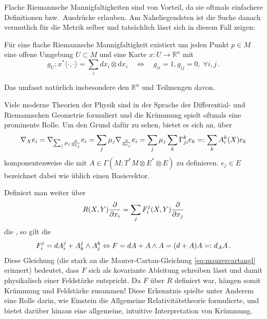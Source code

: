 Flache Riemannsche Mannigfaltigkeiten sind von Vorteil, da sie oftmals einfachere Definitionen bzw.~Ausdrücke erlauben. Am Naheliegendsten ist die Suche danach vermutlich für die Metrik selber und tatsächlich lässt sich in diesem Fall zeigen:

\begin{cor}
Für eine flache Riemannsche Mannigfaltigkeit existiert um jeden Punkt $p \in M$ eine offene Umgebung $U \subset M$ und eine Karte $x: U \rightarrow \mathbb{R}^n$ mit
\begin{equation}
g_U: x^* \langle \cdot, \cdot \rangle = \sum_i dx_i \otimes dx_i \quad \Leftrightarrow \quad g_{ii} = 1, g_{ij} = 0, \; \forall i, j \, .
\end{equation}
\end{cor}
Das umfasst natürlich insbesondere den $\mathbb{R}^n$ und Teilmengen davon.


\begin{bsp}
Viele moderne Theorien der Physik sind in der Sprache der Differential- und Riemannschen Geometrie formuliert und die Krümmung spielt oftmals eine prominente Rolle. Um den Grund dafür zu sehen, bietet es sich an, über
\begin{equation}
\nabla_X e_i = \nabla_{\sum_j \mu_j \pdv{x_j}} e_i = \sum_j \mu_j \nabla_{\pdv{x_j}} e_i = \sum_j \mu_j \sum_k \Gamma_{ji}^k e_k =: \sum_k A_i^k(X) e_k
\end{equation}
komponentenweise die  mit $A \in \Gamma(M; T^*M \otimes E^* \otimes E)$ zu definieren. $e_j \in E$ bezeichnet dabei wie üblich einen Basisvektor.

Definiert man weiter über
\begin{equation}
R(X, Y) \pdv{x_i} = \sum_j F_i^j(X, Y) \pdv{x_j}
\end{equation}
die , so gilt die 
\begin{equation}
F_i^j = dA_i^j + A_k^j \wedge A_j^k \Leftrightarrow F = dA + A \wedge A = \qty(d + A) A =: d_A A \, .
\end{equation}
Diese Gleichung (die stark an die Maurer-Cartan-Gleichung \eqref{eq:maurercartangl} erinnert) bedeutet, dass $F$ sich als kovariante Ableitung\footnotemark{} schreiben lässt und damit physikalisch einer Feldstärke entspricht. Da $F$ über $R$ definiert war, hängen somit Krümmung und Feldstärke zusammen! Diese Erkenntnis spielte unter Anderem eine Rolle darin, wie Einstein die Allgemeine Relativitätstheorie formulierte, und bietet darüber hinaus eine allgemeine, intuitive Interpretation von Krümmung.
\end{bsp}


